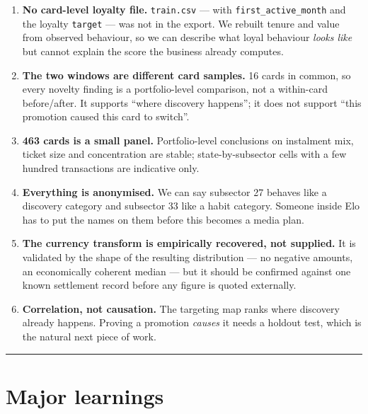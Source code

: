 \documentclass[
]{article}
\providecommand{\tightlist}{%
  \setlength{\itemsep}{0pt}\setlength{\parskip}{0pt}}
\begin{document}
\begin{enumerate}
\def\labelenumi{\arabic{enumi}.}
\tightlist
\item
  \textbf{No card-level loyalty file.} \texttt{train.csv} --- with
  \texttt{first\_active\_month} and the loyalty \texttt{target} --- was
  not in the export. We rebuilt tenure and value from observed
  behaviour, so we can describe what loyal behaviour \emph{looks like}
  but cannot explain the score the business already computes.
\item
  \textbf{The two windows are different card samples.} 16 cards in
  common, so every novelty finding is a portfolio-level comparison, not
  a within-card before/after. It supports ``where discovery happens'';
  it does not support ``this promotion caused this card to switch''.
\item
  \textbf{463 cards is a small panel.} Portfolio-level conclusions on
  instalment mix, ticket size and concentration are stable;
  state-by-subsector cells with a few hundred transactions are
  indicative only.
\item
  \textbf{Everything is anonymised.} We can say subsector 27 behaves
  like a discovery category and subsector 33 like a habit category.
  Someone inside Elo has to put the names on them before this becomes a
  media plan.
\item
  \textbf{The currency transform is empirically recovered, not
  supplied.} It is validated by the shape of the resulting distribution
  --- no negative amounts, an economically coherent median --- but it
  should be confirmed against one known settlement record before any
  figure is quoted externally.
\item
  \textbf{Correlation, not causation.} The targeting map ranks where
  discovery already happens. Proving a promotion \emph{causes} it needs
  a holdout test, which is the natural next piece of work.
\end{enumerate}

\begin{center}\rule{0.5\linewidth}{0.5pt}\end{center}

\section{Major learnings}\label{major-learnings}
\end{document}
